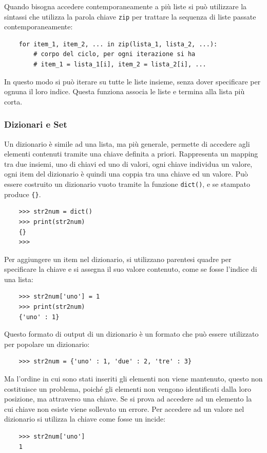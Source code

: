 \documentclass{article}
\numberwithin{equation}{subsection}
\begin{document}
Quando bisogna accedere contemporaneamente a più liste si può utilizzare la sintassi che utilizza la parola chiave \verb|zip| per trattare la sequenza di liste 
passate contemporaneamente:
\begin{verbatim}
    for item_1, item_2, ... in zip(lista_1, lista_2, ...):
        # corpo del ciclo, per ogni iterazione si ha
        # item_1 = lista_1[i], item_2 = lista_2[i], ...
\end{verbatim}
In questo modo si può iterare su tutte le liste insieme, senza dover specificare per ognuna il loro indice. Questa funziona associa le liste e termina alla lista più 
corta. 

\subsubsection{Dizionari e Set}

Un dizionario è simile ad una lista, ma più generale, permette di accedere agli elementi contenuti tramite una chiave definita 
a priori. Rappresenta un mapping tra due insiemi, uno di chiavi ed uno di valori, ogni chiave individua un valore, ogni item 
del dizionario è quindi una coppia tra una chiave ed un valore. 
Può essere costruito un dizionario vuoto tramite la funzione \verb|dict()|, e se stampato produce \verb|{}|. 
\begin{verbatim}
    >>> str2num = dict()
    >>> print(str2num)
    {}
    >>>
\end{verbatim}

Per aggiungere un item nel dizionario, si utilizzano parentesi quadre per specificare la chiave e si assegna il suo valore contenuto, 
come se fosse l'indice di una lista:
\begin{verbatim}
    >>> str2num['uno'] = 1
    >>> print(str2num)
    {'uno' : 1}
\end{verbatim}
Questo formato di output di un dizionario è un formato che può essere utilizzato per popolare un dizionario:
\begin{verbatim}
    >>> str2num = {'uno' : 1, 'due' : 2, 'tre' : 3}
\end{verbatim}
Ma l'ordine in cui sono stati inseriti gli elementi non viene mantenuto, questo non costituisce un problema, poiché gli elementi non 
vengono identificati dalla loro posizione, ma attraverso una chiave. Se si prova ad accedere ad un elemento la cui chiave 
non esiste viene sollevato un errore. Per accedere ad un valore nel dizionario si utilizza la chiave come fosse un incide:
\begin{verbatim}
    >>> str2num['uno']
    1
\end{verbatim}
\end{document}
